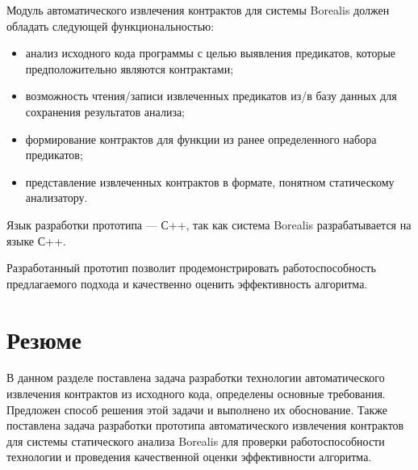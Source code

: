 Модуль автоматического извлечения контрактов для системы Borealis должен обладать следующей функциональностью:
\begin{itemize}
\item анализ исходного кода программы с целью выявления предикатов, которые предположительно являются контрактами;
\item возможность чтения/записи извлеченных предикатов из/в базу данных для сохранения результатов анализа;
\item формирование контрактов для функции из ранее определенного набора предикатов;
\item представление извлеченных контрактов в формате, понятном статическому анализатору.
\end{itemize}
Язык разработки прототипа --- С++\cite{languageC++}, так как система Borealis разрабатывается на языке С++.

Разработанный прототип позволит продемонстрировать работоспособность предлагаемого подхода и качественно оценить эффективность алгоритма.

\section{Резюме}
В данном разделе поставлена задача разработки технологии автоматического извлечения контрактов из исходного кода, определены основные требования. Предложен способ решения этой задачи и выполнено их обоснование. Также поставлена задача разработки прототипа автоматического извлечения контрактов для системы статического анализа Borealis для проверки работоспособности технологии и проведения качественной оценки эффективности алгоритма. 